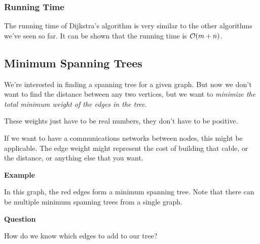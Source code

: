 \documentclass[12pt]{article}
\begin{document}
  \subsubsection{Running Time}

  The running time of Dijkstra's algorithm is very similar to the other algorithms
  we've seen so far. It can be shown that the running time is $\mathcal O(m + n)$.

  \newpage

  \subsection{Minimum Spanning Trees}

  We're interested in finding a spanning tree for a given graph. But now we don't
  want to find the distance between any two vertices, but we want to {\it minimize
  the total minimum weight of the edges in the tree}.

  These weights just have to be real numbers, they don't have to be positive.


  If we want to have a communications networks between nodes, this might be
  applicable. The edge weight might represent the cost of building that cable, or
  the distance, or anything else that you want.

  {\bf Example}

  \begin{center}
  \end{center}

  In this graph, the red edges form a minimum spanning tree. Note that there can
  be multiple minimum spanning trees from a single graph.

  {\bf Question}

  How do we know which edges to add to our tree?
\end{document}
